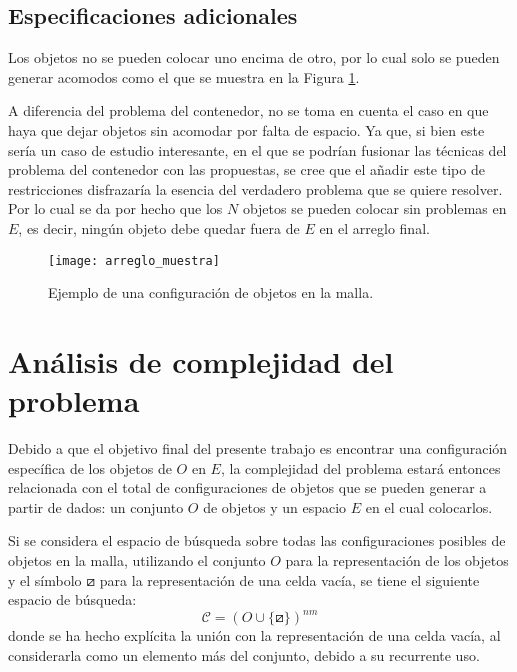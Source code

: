 \subsection{Especificaciones adicionales}
\label{subsec:especificaciones_adicionales}
%
%
Los objetos no se pueden colocar uno encima de otro, por lo cual solo se pueden generar acomodos como el que se muestra en la Figura \ref{fig:muestra_acomodo}.

A diferencia del problema del contenedor, no se toma en cuenta el caso en que haya que dejar objetos sin acomodar por falta de espacio.
Ya que, si bien este sería un caso de estudio interesante, en el que se podrían fusionar las técnicas del problema del contenedor con las propuestas, se cree que el añadir este tipo de restricciones disfrazaría la esencia del verdadero problema que se quiere resolver.
Por lo cual se da por hecho que los $N$ objetos se pueden colocar sin problemas en $E$, es decir, ningún objeto debe quedar fuera de $E$ en el arreglo final.
%
\begin{figure}[H]
	\texttt{[image: arreglo\_muestra]}%
	\caption{Ejemplo de una configuración de objetos en la malla.}%
	\label{fig:muestra_acomodo}%
\end{figure}
%
%
\section{Análisis de complejidad del problema}
\label{sec:analisis_complejidad}
%
%
Debido a que el objetivo final del presente trabajo es encontrar una configuración específica de los objetos de $O$ en $E$, la complejidad del problema estará entonces relacionada con el total de configuraciones de objetos que se pueden generar a partir de dados: un conjunto $O$ de objetos y un espacio $E$ en el cual colocarlos.

Si se considera el espacio de búsqueda sobre todas las configuraciones posibles de objetos en la malla, utilizando el conjunto $O$ para la representación de los objetos y el símbolo $\boxslash$ para la representación de una celda vacía, se tiene el siguiente espacio de búsqueda:
%
\begin{equation}
	\label{eq:complejidad_1}
	\mathcal{C} = (O \cup \{ \boxslash \})^{nm}
\end{equation}
%
donde se ha hecho explícita la unión con la representación de una celda vacía, al considerarla como un elemento más del conjunto, debido a su recurrente uso.


